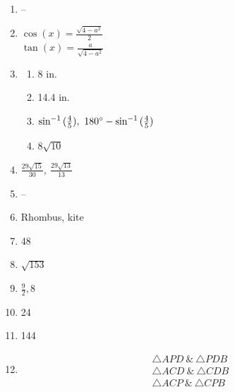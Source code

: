 \documentclass{article}
\begin{document}
\begin{enumerate}
	\begin{enumerate}
	
	\item 12 in.
	
	\item 15 in. or $\sqrt{505}$ in.
	
	\end{enumerate}
	
\item --

\item $\cos{(x)} = \frac{\sqrt{4 - a^2}}{2}$ \\
	$\tan{(x)} = \frac{a}{\sqrt{4 - a^2}}$
	
\item

	\begin{enumerate}
	
	\item 8 in.
	
	\item 14.4 in.
	
	\item $\sin^{-1}{(\frac{4}{5})}, \ 180\degree - \sin^{-1}{(\frac{4}{5})}$
	
	\item $8\sqrt{10}$
	
	\end{enumerate}
	
\item $\frac{29\sqrt{15}}{30}, \ \frac{29\sqrt{13}}{13}$

\item --

\item Rhombus, kite

\item 48

\item $\sqrt{153}$

\item $\frac{9}{2}, 8$

\item 24

\item 144

\item

	\begin{gather*}
	\triangle APD \ \& \ \triangle PDB \\
	\triangle ACD \ \& \ \triangle CDB \\
	\triangle ACP \ \& \ \triangle CPB
	\end{gather*}
	

\end{enumerate}
\end{document}
